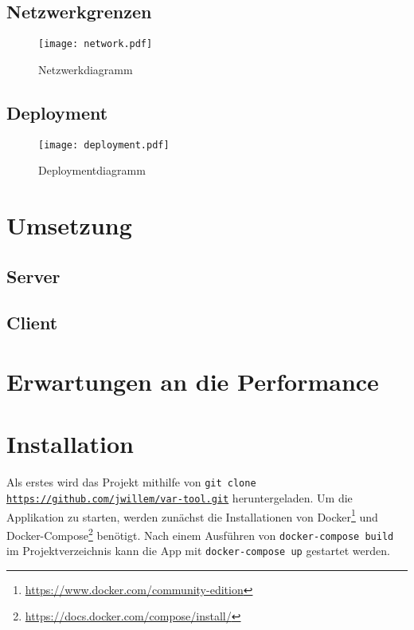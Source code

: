 \subsection{Netzwerkgrenzen}
\blindtext
  \begin{figure}[h]
    \centering
    \texttt{[image: network.pdf]}
    \par
    \caption{Netzwerkdiagramm}
    \label{fig:network}
  \end{figure}
\subsection{Deployment}
\blindtext
\begin{landscape}
  \begin{figure}[h]
    \centering
    \texttt{[image: deployment.pdf]}
    \par
    \caption{Deploymentdiagramm}
    \label{fig:deployment}
  \end{figure}
\end{landscape}
\section{Umsetzung}
\blindtext
\subsection{Server}
\blindtext
\blindtext
\blindtext
\subsection{Client}
\blindtext
\blindtext
\blindtext
\section{Erwartungen an die Performance}
\section{Installation}
Als erstes wird das Projekt mithilfe von \texttt{git clone \url{https://github.com/jwillem/var-tool.git}} heruntergeladen.
Um die Applikation zu starten, werden zunächst die Installationen von Docker\footnote{\url{https://www.docker.com/community-edition}} und Docker-Compose\footnote{\url{https://docs.docker.com/compose/install/}} benötigt.
Nach einem Ausführen von \texttt{docker-compose build} im Projektverzeichnis kann die App mit \texttt{docker-compose up} gestartet werden.
